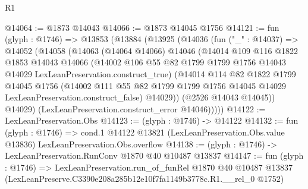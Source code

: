 \begin{lexlean}{R1}
\begin{coremodule}
@14064 := @1873 @14043
@14066 := @1873 @14045 @1756
@14121 := fun (glyph : @1746) =>
  @13853
    (@13884
      (@13925
        (@14036
          (fun ("_" : @14037) =>
          @14052
            (@14058
              (@14063
                (@14064 @14066)
                @14046
                (@14014
                  @109
                  @116
                  @1822
                  @1853
                  @14043
                  @14066
                  (@14002
                    @106
                    @55
                    @82
                    @1799
                    @1799
                    @1756
                    @14043
                    @14029
                    LexLeanPreservation.construct_true)
                  (@14014
                    @114
                    @82
                    @1822
                    @1799
                    @14045
                    @1756
                    (@14002
                      @111
                      @55
                      @82
                      @1799
                      @1799
                      @1756
                      @14045
                      @14029
                      LexLeanPreservation.construct_false)
                    @14029))
                (@2526 @14043 @14045))
              @14029)
            (LexLeanPreservation.construct_error @14046)))))
@14122 := LexLeanPreservation.Obs
@14123 := (glyph : @1746) -> @14122
@14132 := fun (glyph : @1746) =>
  cond.{1} @14122 @13821 (LexLeanPreservation.Obs.value @13836) LexLeanPreservation.Obs.overflow
@14138 := (glyph : @1746) -> LexLeanPreservation.RunConv @1870 @40 @10487 @13837
@14147 := fun (glyph : @1746) =>
  LexLeanPreservation.run_of_funRel
    @1870
    @40
    @10487
    @13837
    (LexLeanPreserve.C3390e208a285b12e10f7fa1149b3778c.R1.__rel_0 @1752)
\end{coremodule}
\end{lexlean}
